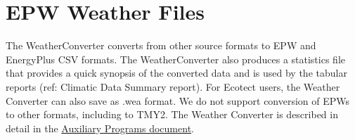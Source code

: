 \section{EPW Weather Files}\label{epw-weather-files}

The WeatherConverter converts from other source formats to EPW and EnergyPlus CSV formats. The WeatherConverter also produces a statistics file that provides a quick synopsis of the converted data and is used by the tabular reports (ref: Climatic Data Summary report). For Ecotect users, the Weather Converter can also save as .wea format. We do not support conversion of EPWs to other formats, including to TMY2. The Weather Converter is described in detail in the \href{AuxiliaryPrograms.pdf}{Auxiliary Programs document}.
